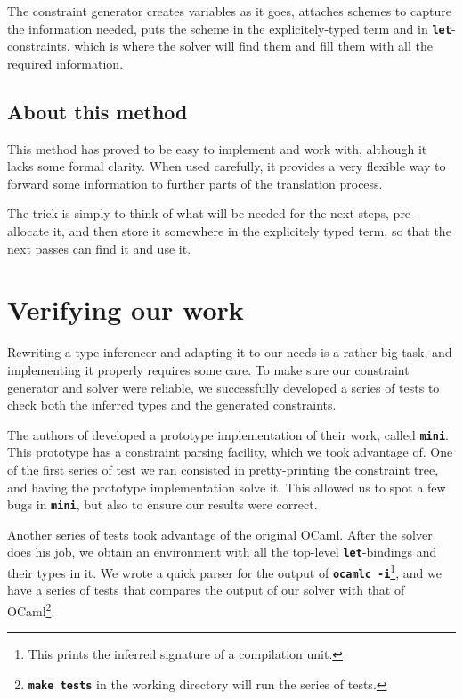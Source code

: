 \documentclass[10pt,a4paper,twoside,titlepage,twocolumn]{article}
\newcommand{\code}[1]{\textbf{\texttt{#1}}}
\begin{document}
The constraint generator creates variables as it goes, attaches schemes to
capture the information needed, puts the scheme in the explicitely-typed term and in
\code{let}-constraints, which is where the solver will find them and fill them
with all the required information.

\subsection{About this method}

This method has proved to be easy to implement and work with, although it lacks
some formal clarity. When used carefully, it provides a very flexible way to
forward some information to further parts of the translation process.

The trick is simply to think of what will be needed for the next steps,
pre-allocate it, and then store it somewhere in the explicitely typed term, so
that the next passes can find it and use it.

\section{Verifying our work}

Rewriting a type-inferencer and adapting it to our needs is a rather big task, and
implementing it properly requires some care. To make sure our constraint
generator and solver were reliable, we successfully developed a series of tests
to check both the inferred types and the generated constraints.

The authors of \cite{pottier2005essence} developed a prototype implementation of
their work, called \code{mini}. This prototype has a constraint parsing
facility, which we took advantage of. One of the first series of test we ran
consisted in pretty-printing the constraint tree, and having the prototype
implementation solve it. This allowed us to spot a few bugs in \code{mini}, but
also to ensure our results were correct.

Another series of tests took advantage of the original OCaml. After the solver
does his job, we obtain an environment with all the top-level
\code{let}-bindings and their types in it. We wrote a quick parser for the
output of \code{ocamlc -i}\footnote{This prints the inferred signature of a
compilation unit.}, and we have a series of tests that compares the output of
our solver with that of OCaml\footnote{\code{make tests} in the working
directory will run the series of tests.}.
\end{document}
